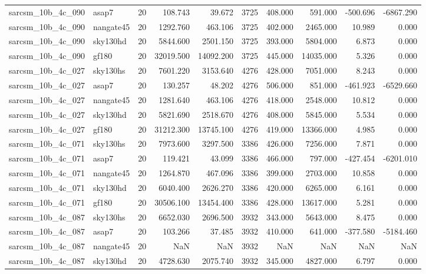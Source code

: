\documentclass{article}
\begin{document}
\begin{longtable}{llrrrrrrrr}
sarcsm\_10b\_4c\_090 & asap7 & 20 & 108.743 & 39.672 & 3725 & 408.000 & 591.000 & -500.696 & -6867.290 \\
sarcsm\_10b\_4c\_090 & nangate45 & 20 & 1292.760 & 463.106 & 3725 & 402.000 & 2465.000 & 10.989 & 0.000 \\
sarcsm\_10b\_4c\_090 & sky130hd & 20 & 5844.600 & 2501.150 & 3725 & 393.000 & 5804.000 & 6.873 & 0.000 \\
sarcsm\_10b\_4c\_090 & gf180 & 20 & 32019.500 & 14092.200 & 3725 & 445.000 & 14035.000 & 5.326 & 0.000 \\
sarcsm\_10b\_4c\_027 & sky130hs & 20 & 7601.220 & 3153.640 & 4276 & 428.000 & 7051.000 & 8.243 & 0.000 \\
sarcsm\_10b\_4c\_027 & asap7 & 20 & 130.257 & 48.202 & 4276 & 506.000 & 851.000 & -461.923 & -6529.660 \\
sarcsm\_10b\_4c\_027 & nangate45 & 20 & 1281.640 & 463.106 & 4276 & 418.000 & 2548.000 & 10.812 & 0.000 \\
sarcsm\_10b\_4c\_027 & sky130hd & 20 & 5821.690 & 2518.670 & 4276 & 408.000 & 5845.000 & 5.534 & 0.000 \\
sarcsm\_10b\_4c\_027 & gf180 & 20 & 31212.300 & 13745.100 & 4276 & 419.000 & 13366.000 & 4.985 & 0.000 \\
sarcsm\_10b\_4c\_071 & sky130hs & 20 & 7973.600 & 3297.500 & 3386 & 426.000 & 7256.000 & 7.871 & 0.000 \\
sarcsm\_10b\_4c\_071 & asap7 & 20 & 119.421 & 43.099 & 3386 & 466.000 & 797.000 & -427.454 & -6201.010 \\
sarcsm\_10b\_4c\_071 & nangate45 & 20 & 1264.870 & 467.096 & 3386 & 399.000 & 2703.000 & 10.858 & 0.000 \\
sarcsm\_10b\_4c\_071 & sky130hd & 20 & 6040.400 & 2626.270 & 3386 & 420.000 & 6265.000 & 6.161 & 0.000 \\
sarcsm\_10b\_4c\_071 & gf180 & 20 & 30506.100 & 13454.400 & 3386 & 428.000 & 13617.000 & 5.281 & 0.000 \\
sarcsm\_10b\_4c\_087 & sky130hs & 20 & 6652.030 & 2696.500 & 3932 & 343.000 & 5643.000 & 8.475 & 0.000 \\
sarcsm\_10b\_4c\_087 & asap7 & 20 & 103.266 & 37.485 & 3932 & 410.000 & 641.000 & -377.580 & -5184.460 \\
sarcsm\_10b\_4c\_087 & nangate45 & 20 & NaN & NaN & 3932 & NaN & NaN & NaN & NaN \\
sarcsm\_10b\_4c\_087 & sky130hd & 20 & 4728.630 & 2075.740 & 3932 & 345.000 & 4827.000 & 6.797 & 0.000 \\

\end{longtable}
\end{document}
